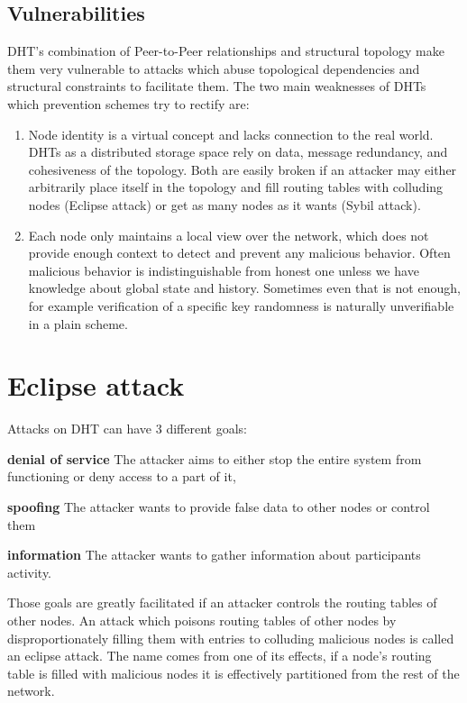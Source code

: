 \subsection{Vulnerabilities}
  DHT's combination of Peer-to-Peer relationships and structural topology make
  them very vulnerable to attacks which abuse topological dependencies and
  structural constraints to facilitate them. The two main weaknesses of DHTs
  which prevention schemes try to rectify are:

  \begin{enumerate}
    \item Node identity is a virtual concept and lacks connection to the real
      world. DHTs as a distributed storage space rely on data, message
      redundancy, and cohesiveness of the topology. Both are easily broken if an
      attacker may either arbitrarily place itself in the topology and fill
      routing tables with colluding nodes (Eclipse attack) or get as many nodes
      as it wants (Sybil attack).

    \item Each node only maintains a local view over the network, which does not
      provide enough context to detect and prevent any malicious behavior. Often
      malicious behavior is indistinguishable from honest one unless we have
      knowledge about global state and history. Sometimes even that is not
      enough, for example verification of a specific key randomness is naturally
      unverifiable in a plain scheme.
  \end{enumerate}

\section{Eclipse attack}
  Attacks on DHT can have 3 different goals:
  \begin{description}
    \item{\textbf{denial of service}} The attacker aims to either stop the
      entire system from functioning or deny access to a part of it,
    \item{\textbf{spoofing}} The attacker wants to provide false data to other
      nodes or control them
    \item{\textbf{information}} The attacker wants to gather information about
      participants activity.
  \end{description}

  Those goals are greatly facilitated if an attacker controls the routing tables
  of other nodes. An attack which poisons routing tables of other nodes by
  disproportionately filling them with entries to colluding malicious nodes is
  called an eclipse attack. The name comes from one of its effects, if a node's
  routing table is filled with malicious nodes it is effectively partitioned
  from the rest of the network.

